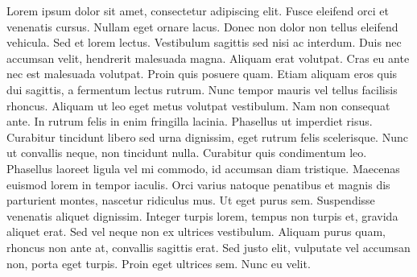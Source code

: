 Lorem ipsum dolor sit amet, consectetur adipiscing elit. Fusce eleifend orci
et venenatis cursus. Nullam eget ornare lacus. Donec non dolor non tellus
eleifend vehicula. Sed et lorem lectus. Vestibulum sagittis sed nisi ac interdum.
Duis nec accumsan velit, hendrerit malesuada magna. Aliquam erat volutpat.
Cras eu ante nec est malesuada volutpat. Proin quis posuere quam. Etiam aliquam
eros quis dui sagittis, a fermentum lectus rutrum. Nunc tempor mauris vel tellus
facilisis rhoncus. Aliquam ut leo eget metus volutpat vestibulum.
Nam non consequat ante. In rutrum felis in enim fringilla lacinia.
Phasellus ut imperdiet risus. Curabitur tincidunt libero sed urna dignissim,
eget rutrum felis scelerisque. Nunc ut convallis neque, non tincidunt nulla.
Curabitur quis condimentum leo. Phasellus laoreet ligula vel mi commodo, id
accumsan diam tristique. Maecenas euismod lorem in tempor iaculis.
Orci varius natoque penatibus et magnis dis parturient montes, nascetur
ridiculus mus. Ut eget purus sem. Suspendisse venenatis aliquet dignissim.
Integer turpis lorem, tempus non turpis et, gravida aliquet erat. Sed vel
neque non ex ultrices vestibulum. Aliquam purus quam, rhoncus non ante at,
convallis sagittis erat. Sed justo elit, vulputate vel accumsan non, porta eget
turpis. Proin eget ultrices sem. Nunc eu velit.